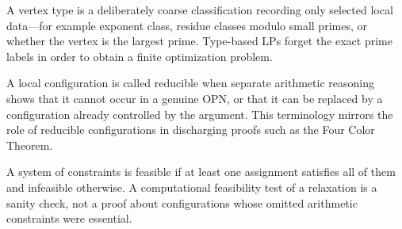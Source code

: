 \documentclass[11pt]{article}
\theoremstyle{definition}
\theoremstyle{remark}
\begin{document}
\begin{description}[style=nextline,leftmargin=1.5em]
\item[Vertex type.]
A vertex type is a deliberately coarse classification recording only selected
local data---for example exponent class, residue classes modulo small primes,
or whether the vertex is the largest prime.  Type-based LPs forget the exact
prime labels in order to obtain a finite optimization problem.

\item[Reducible configuration.]
A local configuration is called reducible when separate arithmetic reasoning
shows that it cannot occur in a genuine OPN, or that it can be replaced by a
configuration already controlled by the argument.  This terminology mirrors
the role of reducible configurations in discharging proofs such as the Four
Color Theorem.

\item[Feasibility and infeasibility.]
A system of constraints is feasible if at least one assignment satisfies all
of them and infeasible otherwise.  A computational feasibility test of a
relaxation is a sanity check, not a proof about configurations whose omitted
arithmetic constraints were essential.
\end{description}
\end{document}
